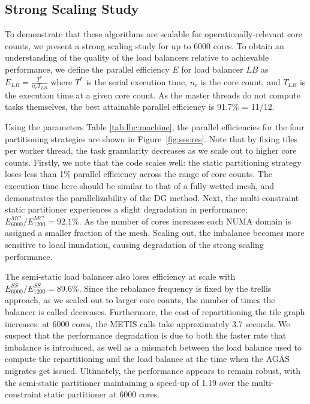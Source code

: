 \subsection{Strong Scaling Study}
To demonstrate that these algorithms are scalable for operationally-relevant core counts, we present a strong scaling study for up to 6000 cores. 
To obtain an understanding of the quality of the load balancers relative to achievable performance, we define the parallel efficiency $E$ for load balancer $LB$ as $E_{LB} = \frac{ T^*}{n_c T_{LB}}$ where $T^*$ is the serial execution time, $n_c$ is the core count, and $T_{LB}$ is the execution time at a given core count. As the master threads do not compute tasks themselves, the best attainable parallel efficiency is 91.7\% = 11/12.

Using the parameters Table \ref{tab:lbc:machine}, the parallel efficiencies for the four partitioning strategies are shown in Figure~\ref{fig:sss:res}. Note that by fixing  tiles per worker thread, the task granularity decreases as we scale out to higher core counts.
Firstly, we note that the code scales well: the static partitioning strategy loses less than 1\% parallel efficiency across the range of core counts. The execution time here should be similar to that of a fully wetted mesh, and demonstrates the parallelizability of the DG method. Next, the multi-constraint static partitioner experiences a slight degradation in performance; $E^{MC}_{6000}/E^{MC}_{1200} = 92.1 \%$. As the number of cores increases each NUMA domain is assigned a smaller fraction of the mesh. Scaling out, the imbalance becomes more sensitive to local inundation, causing degradation of the strong scaling performance.

The semi-static load balancer also loses efficiency at scale with $E^{SS}_{6000}/E^{SS}_{1200}=89.6\%$. Since the rebalance frequency is fixed by the trellis approach, as we scaled out to larger core counts, the number of times the balancer is called decreases. Furthermore, the cost of repartitioning the tile graph increases: at 6000 cores, the METIS calls take approximately 3.7 seconds. We suspect that the performance degradation is due to both the faster rate that imbalance is introduced, as well as a mismatch between the load balance used to compute the repartitioning and the load balance at the time when the AGAS migrates get issued. %
 Ultimately, the performance appears to remain robust, with the semi-static partitioner maintaining a speed-up of 1.19 over the multi-constraint static partitioner at 6000 cores.

